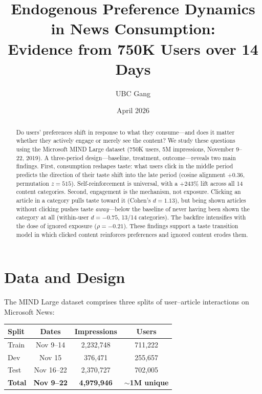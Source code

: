 \documentclass[11pt]{article}
\title{Endogenous Preference Dynamics in News Consumption:\\[6pt]
\large Evidence from 750K Users over 14 Days}
\author{UBC Gang}
\date{April 2026}
\begin{document}
\maketitle

\begin{abstract}
Do users' preferences shift in response to what they consume---and does it matter whether they actively engage or merely see the content? We study these questions using the Microsoft MIND Large dataset (750K users, 5M impressions, November 9--22, 2019). A three-period design---baseline, treatment, outcome---reveals two main findings. First, consumption reshapes taste: what users click in the middle period predicts the direction of their taste shift into the late period (cosine alignment $+0.36$, permutation $z = 515$). Self-reinforcement is universal, with a $+243\%$ lift across all 14 content categories. Second, engagement is the mechanism, not exposure. Clicking an article in a category pulls taste toward it (Cohen's $d = 1.13$), but being shown articles without clicking pushes taste \emph{away}---below the baseline of never having been shown the category at all (within-user $d = -0.75$, 13/14 categories). The backfire intensifies with the dose of ignored exposure ($\rho = -0.21$). These findings support a taste transition model in which clicked content reinforces preferences and ignored content erodes them.
\end{abstract}

\section{Data and Design}

The MIND Large dataset comprises three splits of user--article interactions on Microsoft News:

\begin{center}
\begin{tabular}{lccc}
\toprule
Split & Dates & Impressions & Users \\
\midrule
Train & Nov 9--14 & 2,232,748 & 711,222 \\
Dev & Nov 15 & 376,471 & 255,657 \\
Test & Nov 16--22 & 2,370,727 & 702,005 \\
\midrule
\textbf{Total} & \textbf{Nov 9--22} & \textbf{4,979,946} & \textbf{$\sim$1M unique} \\
\bottomrule
\end{tabular}
\end{center}
\end{document}
